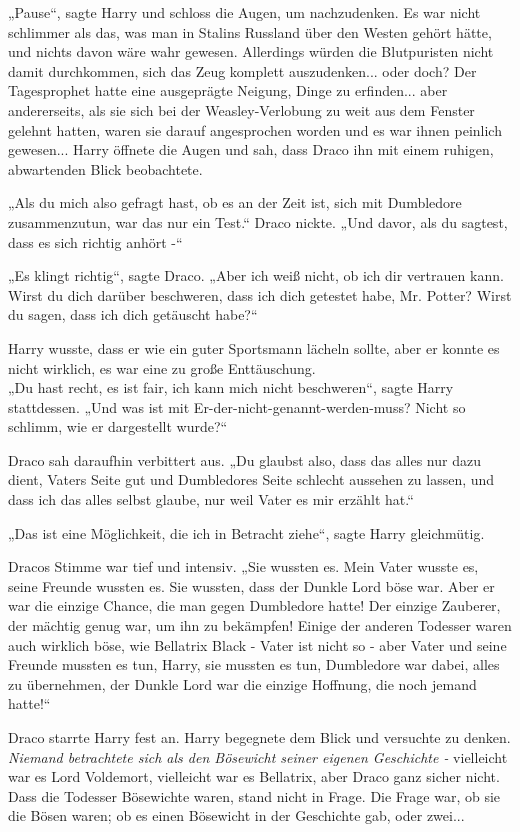 {„Pause“, sagte Harry und schloss die Augen, um nachzudenken. Es war nicht schlimmer als das, was man in Stalins Russland über den Westen gehört hätte, und nichts davon wäre wahr gewesen. Allerdings würden die Blutpuristen nicht damit durchkommen, sich das Zeug komplett auszudenken... oder doch? Der Tagesprophet hatte eine ausgeprägte Neigung, Dinge zu erfinden... aber andererseits, als sie sich bei der Weasley-Verlobung zu weit aus dem Fenster gelehnt hatten, waren sie darauf angesprochen worden und es war ihnen peinlich gewesen... Harry öffnete die Augen und sah, dass Draco ihn mit einem ruhigen, abwartenden Blick beobachtete.

„Als du mich also gefragt hast, ob es an der Zeit ist, sich mit Dumbledore zusammenzutun, war das nur ein Test.“ Draco nickte. „Und davor, als du sagtest, dass es sich richtig anhört -“

„Es klingt richtig“, sagte Draco. „Aber ich weiß nicht, ob ich dir vertrauen kann. Wirst du dich darüber beschweren, dass ich dich getestet habe, Mr. Potter? Wirst du sagen, dass ich dich getäuscht habe?“

Harry wusste, dass er wie ein guter Sportsmann lächeln sollte, aber er konnte es nicht wirklich, es war eine zu große Enttäuschung.\\ „Du hast recht, es ist fair, ich kann mich nicht beschweren“, sagte Harry stattdessen. „Und was ist mit Er-der-nicht-genannt-werden-muss? Nicht so schlimm, wie er dargestellt wurde?“

Draco sah daraufhin verbittert aus. „Du glaubst also, dass das alles nur dazu dient, Vaters Seite gut und Dumbledores Seite schlecht aussehen zu lassen, und dass ich das alles selbst glaube, nur weil Vater es mir erzählt hat.“

„Das ist eine Möglichkeit, die ich in Betracht ziehe“, sagte Harry gleichmütig.

Dracos Stimme war tief und intensiv. „Sie wussten es. Mein Vater wusste es, seine Freunde wussten es. Sie wussten, dass der Dunkle Lord böse war. Aber er war die einzige Chance, die man gegen Dumbledore hatte! Der einzige Zauberer, der mächtig genug war, um ihn zu bekämpfen! Einige der anderen Todesser waren auch wirklich böse, wie Bellatrix Black - Vater ist nicht so - aber Vater und seine Freunde mussten es tun, Harry, sie mussten es tun, Dumbledore war dabei, alles zu übernehmen, der Dunkle Lord war die einzige Hoffnung, die noch jemand hatte!“

Draco starrte Harry fest an. Harry begegnete dem Blick und versuchte zu denken. \emph{Niemand betrachtete sich als den Bösewicht seiner eigenen Geschichte -} vielleicht war es Lord Voldemort, vielleicht war es Bellatrix, aber Draco ganz sicher nicht. Dass die Todesser Bösewichte waren, stand nicht in Frage. Die Frage war, ob sie die Bösen waren; ob es einen Bösewicht in der Geschichte gab, oder zwei...

}
